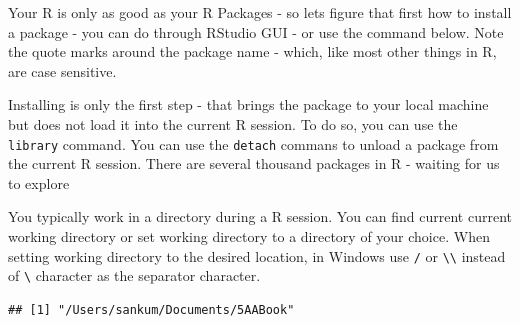 \documentclass[10pt, letterpaper, twoside]{memoir}\usepackage{knitr}
\begin{document}
Your R is only as good as your R Packages - so lets figure that first how to install a package - you can do through RStudio GUI - or use the command below. Note the quote marks around the package name - which, like most other things in R, are case sensitive.
\begin{knitrout}
\color{fgcolor}\begin{kframe}
\begin{alltt}
\hlstd{(}\hlstd{)}
\end{alltt}
\end{kframe}
\end{knitrout}

Installing is only the first step - that brings the package to your local machine but does not load it into the current R session. To do so, you can use the \texttt{library} command. You can use the \texttt{detach} commans to unload a package from the current R session. There are several thousand packages in R - waiting for us to explore
\begin{knitrout}
\color{fgcolor}\begin{kframe}
\begin{alltt}
\hlopt{:}
\end{alltt}
\end{kframe}
\end{knitrout}

You typically work in a directory during a R session. You can find current current working directory or set working directory to a directory of your choice. 
When setting working directory to the desired location, in Windows use \verb|/| or \verb|\\| instead of \verb|\| character as the separator character. 
\begin{knitrout}
\color{fgcolor}\begin{kframe}
\begin{alltt}
\hlstd{()}
\end{alltt}
\begin{verbatim}
## [1] "/Users/sankum/Documents/5AABook"
\end{verbatim}
\end{kframe}
\end{knitrout}
\begin{knitrout}
\color{fgcolor}\begin{kframe}
\begin{alltt}
\hlstd{(}\hlstd{)}
\end{alltt}
\end{kframe}
\end{knitrout}
\end{document}

